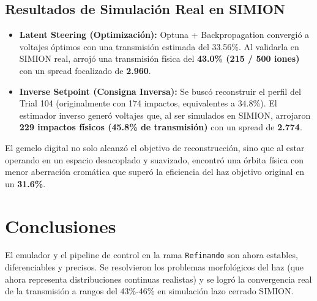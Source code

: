 \documentclass[11pt,spanish]{article}
\begin{document}
\subsection{Resultados de Simulación Real en SIMION}
\begin{itemize}
    \item \textbf{Latent Steering (Optimización):} Optuna + Backpropagation convergió a voltajes óptimos con una transmisión estimada del 33.56\%. Al validarla en SIMION real, arrojó una transmisión física del \textbf{43.0\% (215 / 500 iones)} con un spread focalizado de \textbf{2.960}.
    \item \textbf{Inverse Setpoint (Consigna Inversa):} Se buscó reconstruir el perfil del Trial 104 (originalmente con 174 impactos, equivalentes a $34.8\%$). El estimador inverso generó voltajes que, al ser simulados en SIMION, arrojaron \textbf{229 impactos físicos (45.8\% de transmisión)} con un spread de \textbf{2.774}.
\end{itemize}

El gemelo digital no solo alcanzó el objetivo de reconstrucción, sino que al estar operando en un espacio desacoplado y suavizado, encontró una órbita física con menor aberración cromática que superó la eficiencia del haz objetivo original en un \textbf{31.6\%}.

\section{Conclusiones}
El emulador y el pipeline de control en la rama \texttt{Refinando} son ahora estables, diferenciables y precisos. Se resolvieron los problemas morfológicos del haz (que ahora representa distribuciones continuas realistas) y se logró la convergencia real de la transmisión a rangos del 43\%-46\% en simulación lazo cerrado SIMION.
\end{document}
